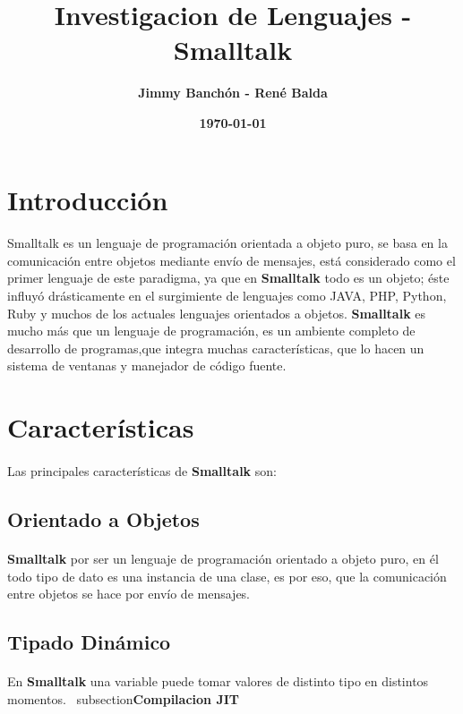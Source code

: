 \documentclass[11pt]{article}
\title{\textbf{Investigacion de Lenguajes - Smalltalk}}
\author{\textbf{Jimmy Banchón - René Balda}}
\date{\textbf{\today}}
\begin{document}


\maketitle
\section{\textbf{Introducción}} 
\paragraph{} \noindent
Smalltalk es un lenguaje de programación orientada a objeto puro, se basa en la comunicación entre objetos mediante envío de mensajes, está considerado como el primer lenguaje de este paradigma, ya que  en \textbf{Smalltalk} todo es un objeto; éste influyó drásticamente en el surgimiente de lenguajes como JAVA, PHP, Python, Ruby y muchos de los actuales lenguajes orientados a objetos.
 \textbf{Smalltalk} es mucho más que un lenguaje de programación, es un ambiente completo de desarrollo de programas,que integra muchas características, que lo hacen un sistema de ventanas y manejador de código fuente.
\section{\textbf{Características}}
\paragraph{} \noindent
Las principales características de  \textbf{Smalltalk} son:
\subsection{\textbf{Orientado a Objetos}}
\paragraph{} \noindent
\textbf{Smalltalk} por ser un lenguaje de programación orientado a objeto puro, en él todo tipo de dato es una instancia de una clase, es por eso, que la comunicación entre objetos se hace por envío de mensajes.
\subsection{\textbf{Tipado Dinámico}}
\paragraph{} \noindent
En \textbf{Smalltalk} una variable puede tomar valores de distinto tipo en distintos momentos.
\ subsection{\textbf{Compilacion JIT}}
\end{document}
